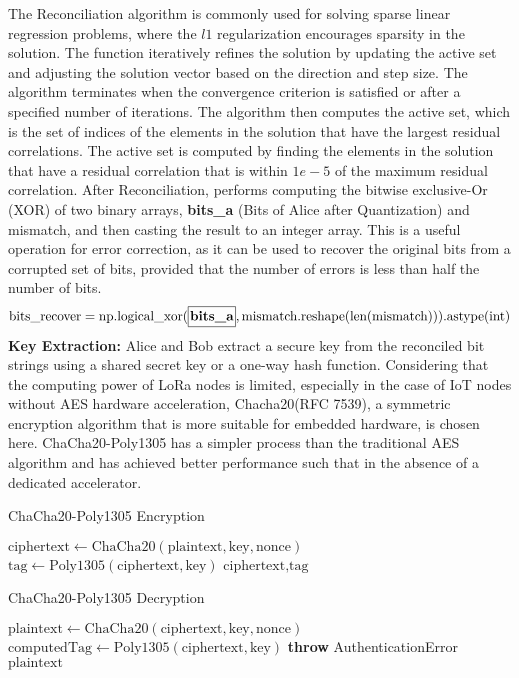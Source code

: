 The Reconciliation algorithm is commonly used for solving sparse linear regression problems, where the $l1$ regularization encourages sparsity in the solution. The function iteratively refines the solution by updating the active set and adjusting the solution vector based on the direction and step size. The algorithm terminates when the convergence criterion is satisfied or after a specified number of iterations.
The algorithm then computes the active set, which is the set of indices of the elements in the solution that have the largest residual correlations. The active set is computed by finding the elements in the solution that have a residual correlation that is within $1e-5$ of the maximum residual correlation.
After Reconciliation, performs computing the bitwise exclusive-Or (XOR) of two binary arrays, \textbf{bits\_a} (Bits of Alice after Quantization) and mismatch, and then casting the result to an integer array. This is a useful operation for error correction, as it can be used to recover the original bits from a corrupted set of bits, provided that the number of errors is less than half the number of bits. 
  \[
  \text{{bits\_recover}} = \text{{np.logical\_xor}}(\textbf{\framebox[1.1\width]{{bits\_a}}}, \text{{mismatch}}.\text{{reshape}}(\text{{len}}(\text{{mismatch}}))).\text{{astype(int)}}
  \]
\textbf{Key Extraction:} Alice and Bob extract a secure key from the reconciled bit strings using a shared secret key or a one-way hash function. Considering that the computing power of LoRa nodes is limited, especially in the case of IoT nodes without AES hardware acceleration, Chacha20(RFC 7539)\cite{rfc7539}, a symmetric encryption algorithm that is more suitable for embedded hardware, is chosen here. ChaCha20-Poly1305 has a simpler process than the traditional AES algorithm and has achieved better performance such that in the absence of a dedicated accelerator\cite{7507408,7927078}.
\begin{algorithm}
    \caption{ChaCha20-Poly1305 Encryption}
    \begin{algorithmic}[1]
        \State $\text{ciphertext} \gets \text{ChaCha20}(\text{plaintext}, \text{key}, \text{nonce})$
        \State $\text{tag} \gets \text{Poly1305}(\text{ciphertext}, \text{key})$
        \State \Return $\text{ciphertext}, \text{tag}$
    \EndFunction
    \end{algorithmic}
\end{algorithm}
    
    \begin{algorithm}
    \caption{ChaCha20-Poly1305 Decryption}
    \begin{algorithmic}[1]
        \State $\text{plaintext} \gets \text{ChaCha20}(\text{ciphertext}, \text{key}, \text{nonce})$
        \State $\text{computedTag} \gets \text{Poly1305}(\text{ciphertext}, \text{key})$
            \State \textbf{throw} AuthenticationError
        \EndIf
        \State \Return $\text{plaintext}$
    \EndFunction
    \end{algorithmic}
\end{algorithm}